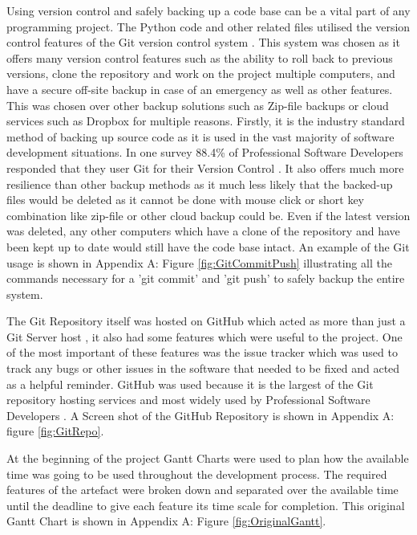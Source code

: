 \documentclass[11pt,a4paper]{report}
\begin{document}
Using version control and safely backing up a code base can be a vital part of any programming project. The Python code and other related files utilised the version control features of the Git version control system \citep{Git}. This system was chosen as it offers many version control features such as the ability to roll back to previous versions, clone the repository and work on the project multiple computers, and have a secure off-site backup in case of an emergency as well as other features. This was chosen over other backup solutions such as Zip-file backups or cloud services such as Dropbox for multiple reasons. Firstly, it is the industry standard method of backing up source code as it is used in the vast majority of software development situations. In one survey 88.4\% of Professional Software Developers responded that they user Git for their Version Control \citep{DeveloperSurvey}. It also offers much more resilience than other backup methods as it much less likely that the backed-up files would be deleted as it cannot be done with mouse click or short key combination like zip-file or other cloud backup could be. Even if the latest version was deleted, any other computers which have a clone of the repository and have been kept up to date would still have the code base intact. An example of the Git usage is shown in Appendix A: Figure \ref{fig:GitCommitPush} illustrating all the commands necessary for a 'git commit' and 'git push' to safely backup the entire system.

The Git Repository itself was hosted on GitHub which acted as more than just a Git Server host \citep{GitHub}, it also had some features which were useful to the project. One of the most important of these features was the issue tracker which was used to track any bugs or other issues in the software that needed to be fixed and acted as a helpful reminder. GitHub was used because it is the largest of the Git repository hosting services and most widely used by Professional Software Developers \citep{GitHubMarketShare}. A Screen shot of the GitHub Repository is shown in Appendix A: figure \ref{fig:GitRepo}.

At the beginning of the project Gantt Charts were used to plan how the available time was going to be used throughout the development process. The required features of the artefact were broken down and separated over the available time until the deadline to give each feature its time scale for completion. This original Gantt Chart is shown in Appendix A: Figure \ref{fig:OriginalGantt}. 
\end{document}
